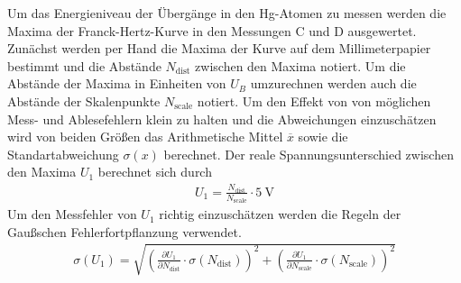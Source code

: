 Um das Energieniveau der Übergänge in den Hg-Atomen zu messen werden die Maxima der Franck-Hertz-Kurve in den Messungen C und D
ausgewertet.
Zunächst werden per Hand die Maxima der Kurve auf dem Millimeterpapier bestimmt und die Abstände $N_\text{dist}$ zwischen den
Maxima notiert.
Um die Abstände der Maxima in Einheiten von $U_B$ umzurechnen werden auch die Abstände der Skalenpunkte $N_\text{scale}$ notiert.
Um den Effekt von von möglichen Mess- und Ablesefehlern klein zu halten und die Abweichungen einzuschätzen wird von beiden Größen 
das Arithmetische Mittel $\overline{x}$ sowie die Standartabweichung $\sigma(x)$ berechnet.
Der reale Spannungsunterschied zwischen den Maxima $U_{1}$ berechnet sich durch
\begin{align}
    U_{1} = \frac{N_\text{dist}}{N_\text{scale}}\cdot \qty{5}{\volt}
\end{align}
Um den Messfehler von $U_{1}$ richtig einzuschätzen werden die Regeln der Gaußschen Fehlerfortpflanzung verwendet.
\begin{align}
    \sigma\left(U_{1}\right) = \sqrt{\left(\frac{\partial U_{1}}{\partial N_\text{dist}} \cdot \sigma\left(N_\text{dist}\right) \right)^2%
                                                    +  \left(\frac{\partial U_{1}}{\partial N_\text{scale}} \cdot \sigma\left(N_\text{scale}\right) \right)^2 }
\end{align}

